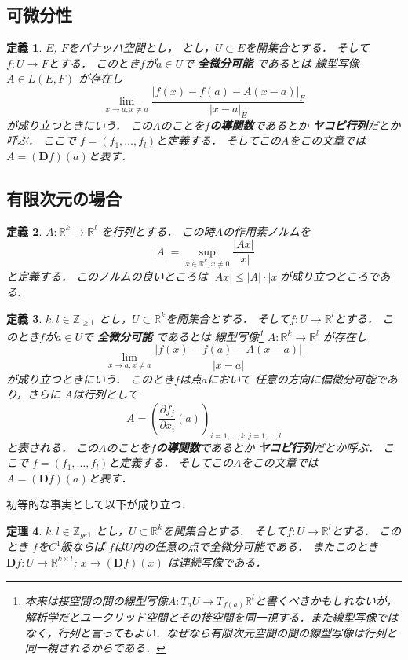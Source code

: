 \documentclass[leqno, a4paper, 12pt]{jsarticle}
\newtheorem{thm}{定理}
\newtheorem{df}[thm]{定義}
\newcommand{\zz}{\mathbb{Z}}
\newcommand{\rr}{\mathbb{R}}
\newcommand{\ddd}{\mathbf{D}}
\begin{document}
\subsection{可微分性}

\begin{df}
$E$, $F$をバナッハ空間とし，
とし，$U\subset E$を開集合とする．
そして$f: U\to F$とする．
このとき$f$が$a\in U$で
\textbf{全微分可能}
であるとは
線型写像
$A\in L(E, F)$
が存在し
\[
\lim_{x\to a, x\neq a}
\frac{|f(x)-f(a)-A(x-a)|_{F}}{|x-a|_{E}}
\]
が成り立つときにいう．
この$A$のことを\textbf{$f$の導関数}であるとか
\textbf{ヤコビ行列}だとか呼ぶ．
ここで
$f=(f_{1}, \dots, f_{l})$と定義する．
そしてこの$A$をこの文章では
$A=(\ddd f)(a)$と表す．
\end{df}




\subsection{有限次元の場合}





\begin{df}
$A: \rr^{k}\to \rr^{l}$
を行列とする．
この時$A$の作用素ノルムを
\[
|A|=\sup_{x\in \rr^{k}, x\neq 0}\frac{|Ax|}{|x|}
\]
と定義する．
このノルムの良いところは
$|Ax|\le |A|\cdot |x|$が成り立つところである.

\end{df}

\begin{df}
$k, l\in \zz_{\ge 1}$
とし，$U\subset \rr^{k}$を開集合とする．
そして$f: U\to \rr^{l}$とする．
このとき$f$が$a\in U$で
\textbf{全微分可能}
であるとは
線型写像\footnote{本来は接空間の間の線型写像$A: T_{a}U\to T_{f(a)}\rr^{l}$と書くべきかもしれないが，解析学だとユークリッド空間とその接空間を同一視する．また線型写像ではなく，行列と言ってもよい．なぜなら有限次元空間の間の線型写像は行列と同一視されるからである．}
$A: \rr^{k}\to \rr^{l}$
が存在し
\[
\lim_{x\to a, x\neq a}
\frac{|f(x)-f(a)-A(x-a)|}{|x-a|}
\]
が成り立つときにいう．
このとき$f$は点$a$において
任意の方向に偏微分可能であり，さらに
$A$は行列として
\[
A=\left(\frac{\partial f_{j}}{\partial x_{i}}(a)\right)_{i=1, \dots, k, j=1, \dots, l}
\]
と表される．
この$A$のことを\textbf{$f$の導関数}であるとか
\textbf{ヤコビ行列}だとか呼ぶ．
ここで
$f=(f_{1}, \dots, f_{l})$と定義する．
そしてこの$A$をこの文章では
$A=(\ddd f)(a)$と表す．
\end{df}


初等的な事実として以下が成り立つ．
\begin{thm}
$k, l\in \zz_{ge 1}$
とし，$U\subset \rr^{k}$を開集合とする．
そして$f: U\to \rr^{l}$とする．
このとき
$f$を$C^{1}$級ならば
$f$は$U$内の任意の点で全微分可能である．
またこのとき$\ddd f: U\to \rr^{k\times l}$; 
$x\to (\ddd f)(x)$
は連続写像である．
\end{thm}
\end{document}
